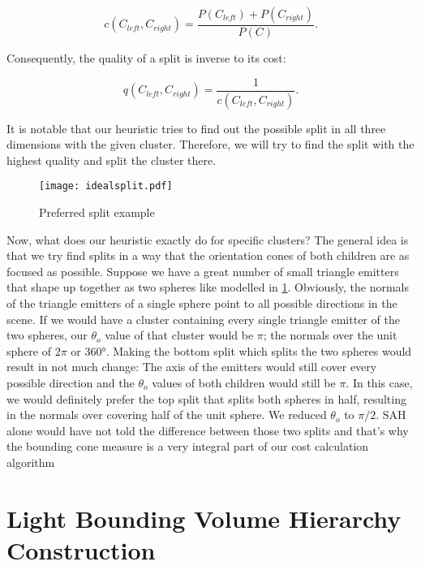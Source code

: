 \begin{equation}
c(C_{left}, C_{right}) = \frac{P(C_{left}) + P(C_{right})}{P(C)}.
\end{equation}

Consequently, the quality of a split is inverse to its cost:

\begin{equation}
q(C_{left}, C_{right}) = \frac{1}{c(C_{left}, C_{right})}.
\end{equation}

It is notable that our heuristic tries to find out the possible split in all three dimensions with the given cluster. Therefore, we will try to find the split with the highest quality and split the cluster there.

\begin{figure}
	\begin{center}
		\texttt{[image: idealsplit.pdf]}
		\caption{Preferred split example}
		\label{fig:idealsplit}
	\end{center}
\end{figure}


Now, what does our heuristic exactly do for specific clusters? The general idea is that we try find splits in a way that the orientation cones of both children are as focused as possible. Suppose we have a great number of small triangle emitters that shape up together as two spheres like modelled in \ref{fig:idealsplit}. Obviously, the normals of the triangle emitters of a single sphere point to all possible directions in the scene. If we would have a cluster containing every single triangle emitter of the two spheres, our $\theta_o$ value of that cluster would be $\pi$; the normals over the unit sphere of $2\pi$ or 360°. Making the bottom split which splits the two spheres would result in not much change: The axis of the emitters would still cover every possible direction and the $\theta_o$ values of both children would still be $\pi$. In this case, we would definitely prefer the top split that splits both spheres in half, resulting in the normals over covering half of the unit sphere. We reduced $\theta_o$ to $\pi/2$. SAH alone would have not told the difference between those two splits and that's why the bounding cone measure is a very integral part of our cost calculation algorithm

\section{Light Bounding Volume Hierarchy Construction}
\label{sec:alg:con}


